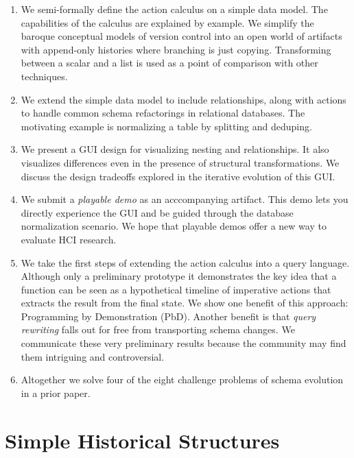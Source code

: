 \documentclass[english,submission]{programming}
\theoremstyle{definition}
\begin{document}
\begin{enumerate}

  \item We semi-formally define the action calculus on a simple data model. The capabilities of the calculus are explained by example. We simplify the baroque conceptual models of version control into an open world of artifacts with append-only histories where branching is just copying. Transforming between a scalar and a list is used as a point of comparison with other techniques.

  \item We extend the simple data model to include relationships, along with actions to handle common schema refactorings in relational databases. The motivating example is normalizing a table by splitting and deduping.

  \item We present a GUI design for visualizing nesting and relationships. It also visualizes differences even in the presence of structural transformations. We discuss the design tradeoffs explored in the iterative evolution of this GUI.

  \item We submit a \textit{playable demo} as an acccompanying artifact. This demo lets you directly experience the GUI and be guided through the database normalization scenario. We hope that playable demos offer a new way to evaluate HCI research.

  \item We take the first steps of extending the action calculus into a query language. Although only a preliminary prototype it demonstrates the key idea that a function can be seen as a hypothetical timeline of imperative actions that extracts the result from the final state. We show one benefit of this approach: Programming by Demonstration (PbD). Another benefit is that \textit{query rewriting} falls out for free from transporting schema changes. We communicate these very preliminary results because the community may find them intriguing and controversial.

  \item Altogether we solve four of the eight challenge problems of schema evolution in a prior paper\cite{challenge-problems}.

\end{enumerate}








\section{Simple Historical Structures}
\end{document}
